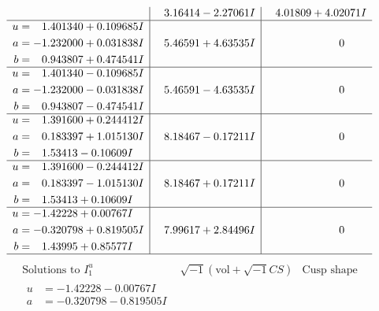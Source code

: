 \documentclass[1p]{elsarticle_modified}
\theoremstyle{definition}
\newcommand{\I}{\sqrt{-1}}
\begin{document}
$$\begin{array}{c|c|c}
 & \phantom{-}3.16414 - 2.27061 I & \phantom{-}4.01809 + 4.02071 I \\ \hline\begin{aligned}
u &= \phantom{-}1.401340 + 0.109685 I \\
a &= -1.232000 + 0.031838 I \\
b &= \phantom{-}0.943807 + 0.474541 I\end{aligned}
 & \phantom{-}5.46591 + 4.63535 I & \phantom{-0.000000 } 0 \\ \hline\begin{aligned}
u &= \phantom{-}1.401340 - 0.109685 I \\
a &= -1.232000 - 0.031838 I \\
b &= \phantom{-}0.943807 - 0.474541 I\end{aligned}
 & \phantom{-}5.46591 - 4.63535 I & \phantom{-0.000000 } 0 \\ \hline\begin{aligned}
u &= \phantom{-}1.391600 + 0.244412 I \\
a &= \phantom{-}0.183397 + 1.015130 I \\
b &= \phantom{-}1.53413 - 0.10609 I\end{aligned}
 & \phantom{-}8.18467 - 0.17211 I & \phantom{-0.000000 } 0 \\ \hline\begin{aligned}
u &= \phantom{-}1.391600 - 0.244412 I \\
a &= \phantom{-}0.183397 - 1.015130 I \\
b &= \phantom{-}1.53413 + 0.10609 I\end{aligned}
 & \phantom{-}8.18467 + 0.17211 I & \phantom{-0.000000 } 0 \\ \hline\begin{aligned}
u &= -1.42228 + 0.00767 I \\
a &= -0.320798 + 0.819505 I \\
b &= \phantom{-}1.43995 + 0.85577 I\end{aligned}
 & \phantom{-}7.99617 + 2.84496 I & \phantom{-0.000000 } 0\\
 \hline 
 \end{array}$$\newpage$$\begin{array}{c|c|c}  
\text{Solutions to }I^u_{1}& \I (\text{vol} + \sqrt{-1}CS) & \text{Cusp shape}\\
 \hline 
\begin{aligned}
u &= -1.42228 - 0.00767 I \\
a &= -0.320798 - 0.819505 I \\

\end{aligned}
\end{array}$$
\end{document}
